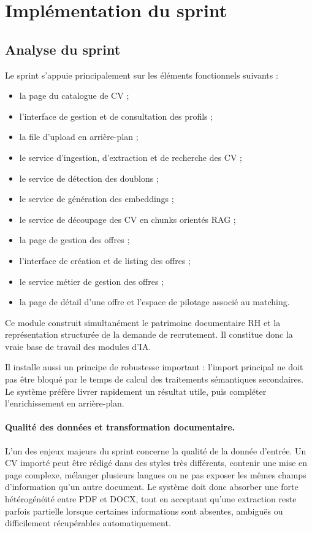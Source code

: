 \section{Implémentation du sprint}

\subsection{Analyse du sprint}
Le sprint s'appuie principalement sur les éléments fonctionnels suivants :
\begin{itemize}
  \item la page du catalogue de CV ;
  \item l'interface de gestion et de consultation des profils ;
  \item la file d'upload en arrière-plan ;
  \item le service d'ingestion, d'extraction et de recherche des CV ;
  \item le service de détection des doublons ;
  \item le service de génération des embeddings ;
  \item le service de découpage des CV en chunks orientés RAG ;
  \item la page de gestion des offres ;
  \item l'interface de création et de listing des offres ;
  \item le service métier de gestion des offres ;
  \item la page de détail d'une offre et l'espace de pilotage associé au matching.
\end{itemize}

Ce module construit simultanément le patrimoine documentaire RH et la représentation structurée de la demande de recrutement. Il constitue donc la vraie base de travail des modules d'IA.

Il installe aussi un principe de robustesse important : l'import principal ne doit pas être bloqué par le temps de calcul des traitements sémantiques secondaires. Le système préfère livrer rapidement un résultat utile, puis compléter l'enrichissement en arrière-plan.
\paragraph{Qualité des données et transformation documentaire.}
L'un des enjeux majeurs du sprint concerne la qualité de la donnée d'entrée. Un CV importé peut être rédigé dans des styles très différents, contenir une mise en page complexe, mélanger plusieurs langues ou ne pas exposer les mêmes champs d'information qu'un autre document. Le système doit donc absorber une forte hétérogénéité entre PDF et DOCX, tout en acceptant qu'une extraction reste parfois partielle lorsque certaines informations sont absentes, ambiguës ou difficilement récupérables automatiquement.

